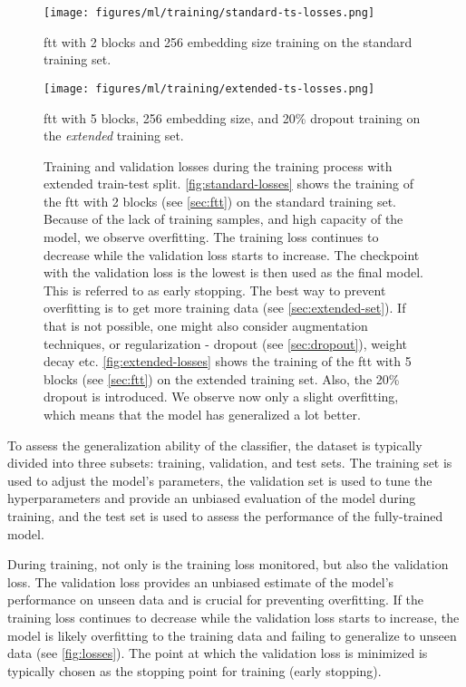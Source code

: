 \begin{figure}[htb]
    \centering
    \begin{minipage}[t][\height][t]{0.47\textwidth}
        \texttt{[image: figures/ml/training/standard-ts-losses.png]}
        \caption{\gls{ftt} with 2 blocks and 256 embedding size training on the standard training set.}
        \label{fig:standard-losses}
    \end{minipage}
    \hfill
    \begin{minipage}[t][\height][t]{0.47\textwidth}
        \texttt{[image: figures/ml/training/extended-ts-losses.png]}
        \caption{\gls{ftt} with 5 blocks, 256 embedding size, and 20\% dropout training on the \emph{extended} training
            set.} \label{fig:extended-losses}
    \end{minipage}
    \caption{Training and validation losses during the training process with extended train-test split.
        \autoref{fig:standard-losses} shows the training of the \gls{ftt} with 2 blocks (see \autoref{sec:ftt}) on the
        standard training set. Because of the lack of training samples, and high capacity of the model, we observe
        overfitting. The training loss continues to decrease while the validation loss starts to increase. The
        checkpoint with the validation loss is the lowest is then used as the final model. This is referred to as early
        stopping. The best way to prevent overfitting is to get more training data (see
        \autoref{sec:extended-set}). If that is not possible, one might also consider augmentation techniques, or
        regularization - dropout (see \autoref{sec:dropout}), weight decay etc. \autoref{fig:extended-losses} shows the
        training of the \gls{ftt} with 5 blocks (see \autoref{sec:ftt}) on the extended training set. Also, the 20\%
        dropout is introduced. We observe now only a slight overfitting, which means that the model has generalized
        a lot better.}
    \label{fig:losses}
\end{figure}

To assess the generalization ability of the classifier, the dataset is typically divided into three subsets: training,
validation, and test sets. The training set is used to adjust the model's parameters, the validation set is used to tune
the hyperparameters and provide an unbiased evaluation of the model during training, and the test set is used to assess
the performance of the fully-trained model.

During training, not only is the training loss monitored, but also the validation loss. The validation loss provides an
unbiased estimate of the model's performance on unseen data and is crucial for preventing overfitting. If the training
loss continues to decrease while the validation loss starts to increase, the model is likely overfitting to the training
data and failing to generalize to unseen data (see \autoref{fig:losses}). The point at which the validation loss is
minimized is typically chosen as the stopping point for training (early stopping).

